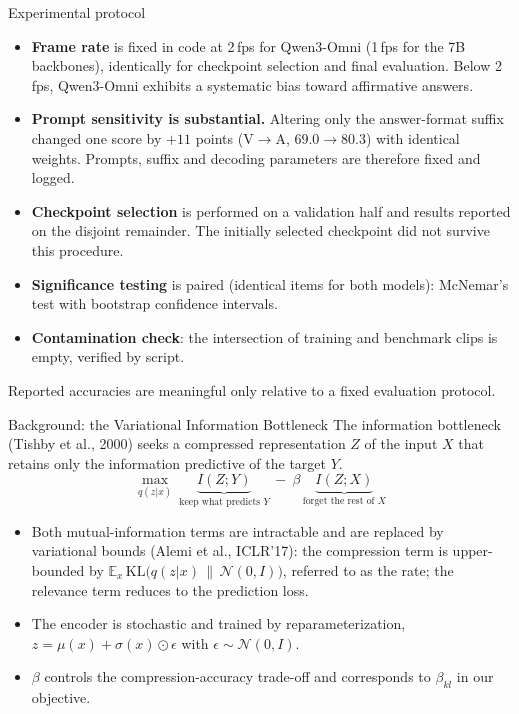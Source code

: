 \documentclass[aspectratio=169,11pt]{beamer}
\begin{document}
\begin{frame}{Experimental protocol}
\begin{itemize}\footnotesize
\item \textbf{Frame rate} is fixed in code at 2\,fps for Qwen3-Omni (1\,fps for the 7B backbones),
identically for checkpoint selection and final evaluation. Below 2\,fps, Qwen3-Omni exhibits a
systematic bias toward affirmative answers.
\item \textbf{Prompt sensitivity is substantial.} Altering only the answer-format suffix changed one
score by $+11$ points (V$\to$A, $69.0 \to 80.3$) with identical weights. Prompts, suffix and decoding
parameters are therefore fixed and logged.
\item \textbf{Checkpoint selection} is performed on a validation half and results reported on the
disjoint remainder. The initially selected checkpoint did not survive this procedure.
\item \textbf{Significance testing} is paired (identical items for both models): McNemar's test with
bootstrap confidence intervals.
\item \textbf{Contamination check}: the intersection of training and benchmark clips is empty,
verified by script.
\end{itemize}
\vfill
\begin{center}
\begin{block}{}
\centering\footnotesize Reported accuracies are meaningful only relative to a fixed evaluation protocol.
\end{block}
\end{center}
\end{frame}


\begin{frame}{Background: the Variational Information Bottleneck}
{\footnotesize The information bottleneck (Tishby et al., 2000) seeks a compressed representation $Z$ of
the input $X$ that retains only the information predictive of the target $Y$.}
\vspace{-0.2em}
\[
\max_{q(z|x)}\ \underbrace{I(Z;Y)}_{\text{keep what predicts }Y}\ -\ \beta\,\underbrace{I(Z;X)}_{\text{forget the rest of }X}
\]
\vspace{-0.5em}
\begin{itemize}\footnotesize
\item Both mutual-information terms are intractable and are replaced by variational bounds (Alemi
et al., ICLR'17): the compression term is upper-bounded by
$\mathbb E_x\,\mathrm{KL}\!\big(q(z|x)\,\|\,\mathcal N(0,I)\big)$, referred to as the rate; the
relevance term reduces to the prediction loss.
\item The encoder is stochastic and trained by reparameterization,
$z=\mu(x)+\sigma(x)\odot\epsilon$ with $\epsilon\sim\mathcal N(0,I)$.
\item $\beta$ controls the compression-accuracy trade-off and corresponds to $\beta_{kl}$ in our
objective.
\end{itemize}
\end{frame}
\end{document}

